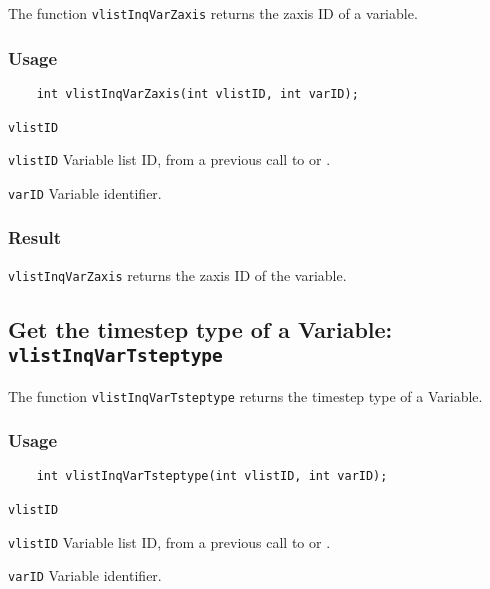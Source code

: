 The function {\texttt{vlistInqVarZaxis}} returns the zaxis ID of a variable.

\subsubsection*{Usage}

\begin{verbatim}
    int vlistInqVarZaxis(int vlistID, int varID);
\end{verbatim}

\hspace*{4mm}\begin{minipage}[]{15cm}
\begin{deflist}{\texttt{vlistID}\ }
\item[\texttt{vlistID}]
Variable list ID, from a previous call to {} or {}.
\item[\texttt{varID}]
Variable identifier.

\end{deflist}
\end{minipage}

\subsubsection*{Result}

{\texttt{vlistInqVarZaxis}} returns the zaxis ID of the variable.



\subsection{Get the timestep type of a Variable: \texttt{vlistInqVarTsteptype}}
\label{vlistInqVarTsteptype}

The function {\texttt{vlistInqVarTsteptype}} returns the timestep type of a Variable.

\subsubsection*{Usage}

\begin{verbatim}
    int vlistInqVarTsteptype(int vlistID, int varID);
\end{verbatim}

\hspace*{4mm}\begin{minipage}[]{15cm}
\begin{deflist}{\texttt{vlistID}\ }
\item[\texttt{vlistID}]
Variable list ID, from a previous call to {} or {}.
\item[\texttt{varID}]
Variable identifier.

\end{deflist}
\end{minipage}

